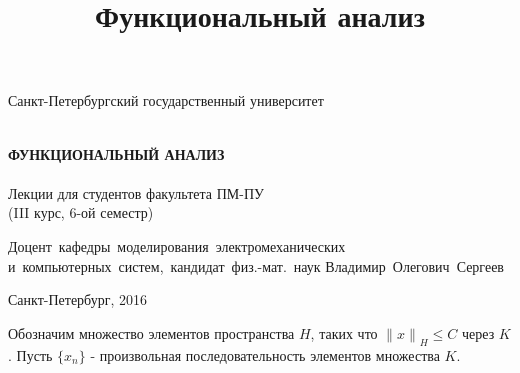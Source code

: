 \documentclass[12pt,a4paper,titlepage, oneside]{book}
\title{Функциональный анализ}
\theoremstyle{definition}
\theoremstyle{plain}
\theoremstyle{remark}
\theoremstyle{remark}
\theoremstyle{remark}
\theoremstyle{remark}
\theoremstyle{plain}
\theoremstyle{plain}
\begin{document}
\begin{titlepage}

\begin{center}
\vfill

Санкт-Петербургский государственный университет\\
\ \\

\vfill

{\large\bf ФУНКЦИОНАЛЬНЫЙ АНАЛИЗ\\}
\ \\
Лекции для студентов факультета ПМ-ПУ\\
(III курс, 6-ой семестр)

\vfill

\hfill\vbox
{
\hbox{Доцент кафедры моделирования электромеханических}
\hbox{и компьютерных систем, кандидат физ.-мат. наук}
\hbox{Владимир Олегович Сергеев}
}

\vfill

Санкт-Петербург, 2016
\end{center}

\end{titlepage}


Обозначим множество элементов пространства $H$, таких что ${\parallel x \parallel} _H \leq C$ через $K$. Пусть $\lbrace x_n \rbrace$ - произвольная последовательность элементов множества $K$.
\end{document}
